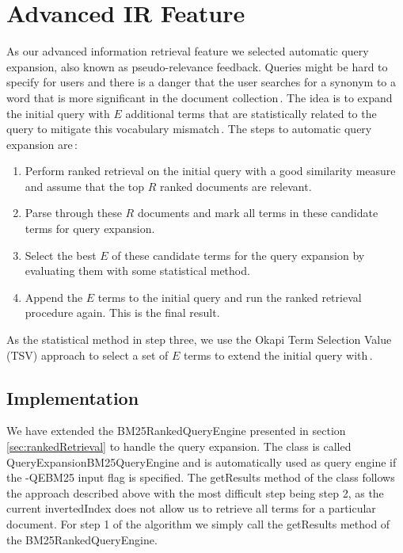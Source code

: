 
\section{Advanced IR Feature}
As our advanced information retrieval feature we selected automatic query expansion, also known as pseudo-relevance feedback. Queries might be hard to specify for users and there is a danger that the user searches for a synonym to a word that is more significant in the document collection\,\cite{billerbeckzobel04}. The idea is to expand the initial query with $E$ additional terms that are statistically related to the query to mitigate this vocabulary mismatch\,\cite{billerbeckzobel04}. The steps to automatic query expansion are\,\cite{scholer13}: 

\begin{enumerate}
	\item Perform ranked retrieval on the initial query with a good similarity measure and assume that the top $R$ ranked documents are relevant.
	\item Parse through these $R$ documents and mark all terms in these candidate terms for query expansion.
	\item Select the best $E$ of these candidate terms for the query expansion by evaluating them with some statistical method.
	\item Append the $E$ terms to the initial query and run the ranked retrieval procedure again. This is the final result.
\end{enumerate}

As the statistical method in step three, we use the Okapi Term Selection Value (TSV) approach to select a set of $E$ terms to extend the initial query with\,\cite{billerbeckzobel04}.

\subsection{Implementation}
We have extended the BM25RankedQueryEngine presented in section \ref{sec:rankedRetrieval} to handle the query expansion. The class is called QueryExpansionBM25QueryEngine and is automatically used as query engine if the -QEBM25 input flag is specified. The getResults method of the class follows the approach described above with the most difficult step being step 2, as the current invertedIndex does not allow us to retrieve all terms for a particular document. For step 1 of the algorithm we simply call the getResults method of the BM25RankedQueryEngine.

